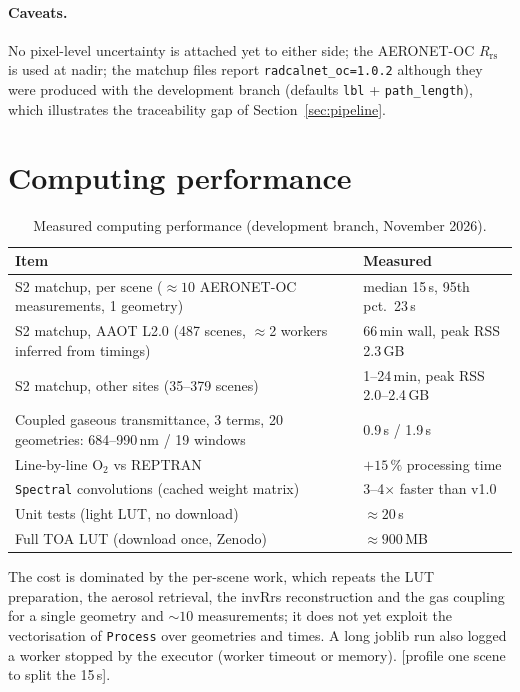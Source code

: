 \documentclass[11pt,a4paper]{article}
\newcommand{\Rrs}{R_\mathrm{rs}}
\newcommand{\code}[1]{\texttt{#1}}
\newcommand{\todo}[1]{\textcolor{red!70!black}{[#1]}}
\begin{document}
\paragraph{Caveats.} No pixel-level uncertainty is attached yet to either side; the AERONET-OC $\Rrs$ is
used at nadir; the matchup files report \code{radcalnet\_oc=1.0.2} although they were produced with the
development branch (defaults \code{lbl} + \code{path\_length}), which illustrates the traceability gap of
Section~\ref{sec:pipeline}.

\section{Computing performance}

\begin{table}[h]
\centering\small
\caption{Measured computing performance (development branch, November 2026).}
\label{tab:perf}
\begin{tabularx}{\textwidth}{Xl}
\toprule
Item & Measured \\
\midrule
S2 matchup, per scene ($\approx10$ AERONET-OC measurements, 1 geometry) & median 15\,s, 95th pct.\ 23\,s \\
S2 matchup, AAOT L2.0 (487 scenes, $\approx$2 workers inferred from timings) & 66\,min wall, peak RSS 2.3\,GB \\
S2 matchup, other sites (35--379 scenes) & 1--24\,min, peak RSS 2.0--2.4\,GB \\
Coupled gaseous transmittance, 3 terms, 20 geometries: 684--990\,nm / 19 windows & 0.9\,s / 1.9\,s \\
Line-by-line O$_2$ vs REPTRAN & $+15\,\%$ processing time \\
\code{Spectral} convolutions (cached weight matrix) & 3--4$\times$ faster than v1.0 \\
Unit tests (light LUT, no download) & $\approx20$\,s \\
Full TOA LUT (download once, Zenodo) & $\approx900$\,MB \\
\bottomrule
\end{tabularx}
\end{table}

The cost is dominated by the per-scene work, which repeats the LUT preparation, the aerosol retrieval, the
invRrs reconstruction and the gas coupling for a single geometry and $\sim10$ measurements; it does not yet
exploit the vectorisation of \code{Process} over geometries and times. A long joblib run also logged a worker
stopped by the executor (worker timeout or memory). \todo{profile one scene to split the 15\,s}.
\end{document}
